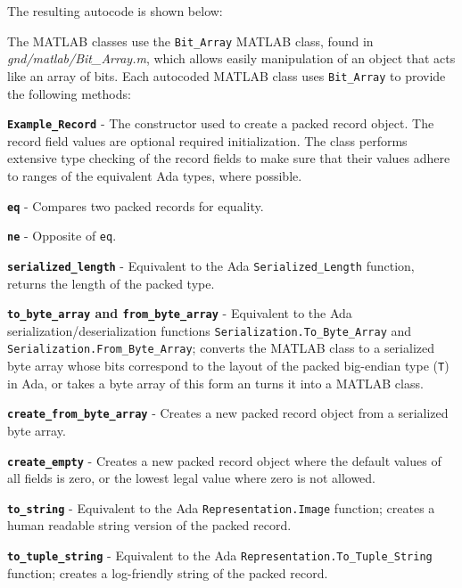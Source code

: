 The resulting autocode is shown below:


The MATLAB classes use the \texttt{Bit\_Array} MATLAB class, found in \textit{gnd/matlab/Bit\_Array.m}, which allows easily manipulation of an object that acts like an array of bits. Each autocoded MATLAB class uses \texttt{Bit\_Array} to provide the following methods:

\vspace{5mm} %
\begin{spaceditemize}
  \item \textbf{\texttt{Example\_Record}} - The constructor used to create a packed record object. The record field values are optional required initialization. The class performs extensive type checking of the record fields to make sure that their values adhere to ranges of the equivalent Ada types, where possible.
  \item \textbf{\texttt{eq}} - Compares two packed records for equality.
  \item \textbf{\texttt{ne}} - Opposite of \texttt{eq}.
  \item \textbf{\texttt{serialized\_length}} - Equivalent to the Ada \texttt{Serialized\_Length} function, returns the length of the packed type.
  \item \textbf{\texttt{to\_byte\_array} and \texttt{from\_byte\_array}} - Equivalent to the Ada serialization/deserialization functions \texttt{Serialization.To\_Byte\_Array} and \texttt{Serialization.From\_Byte\_Array}; converts the MATLAB class to a serialized byte array whose bits correspond to the layout of the packed big-endian type (\texttt{T}) in Ada, or takes a byte array of this form an turns it into a MATLAB class.
  \item \textbf{\texttt{create\_from\_byte\_array}} - Creates a new packed record object from a serialized byte array.
  \item \textbf{\texttt{create\_empty}} - Creates a new packed record object where the default values of all fields is zero, or the lowest legal value where zero is not allowed.
  \item \textbf{\texttt{to\_string}} - Equivalent to the Ada \texttt{Representation.Image} function; creates a human readable string version of the packed record.
  \item \textbf{\texttt{to\_tuple\_string}} - Equivalent to the Ada \texttt{Representation.To\_Tuple\_String} function; creates a log-friendly string of the packed record.
\end{spaceditemize}
\vspace{5mm} %

